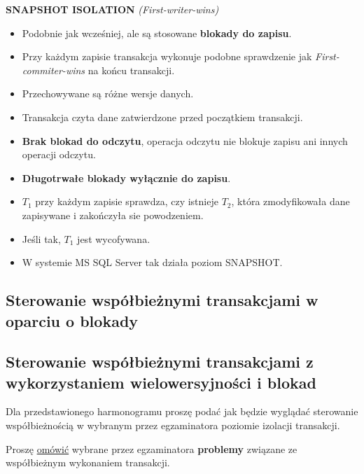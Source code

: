 \textbf{SNAPSHOT ISOLATION} \textit{(First-writer-wins)}
\begin{itemize}
    \item Podobnie jak wcześniej, ale są stosowane
    \textbf{blokady do zapisu}.
    \item Przy każdym zapisie transakcja wykonuje podobne sprawdzenie jak
    \textit{First-commiter-wins} na końcu transakcji.
    \item Przechowywane są różne wersje danych.
    \item Transakcja czyta dane zatwierdzone przed początkiem transakcji.
    \item \textbf{Brak blokad do odczytu}, operacja odczytu nie blokuje
    zapisu ani innych operacji odczytu.
    \item \textbf{Długotrwałe blokady wyłącznie do zapisu}.
    \item $T_1$ przy każdym zapisie sprawdza, czy istnieje $T_2$, która
    zmodyfikowała dane zapisywane i zakończyła sie powodzeniem.
    \item Jeśli tak, $T_1$ jest wycofywana.
    \item W systemie MS SQL Server tak działa poziom SNAPSHOT.
\end{itemize}

\pagebreak

\subsection{Sterowanie współbieżnymi transakcjami w oparciu o blokady}
\label{sub:sterowanie_wspolbieznymi_blokady}


\subsection{Sterowanie współbieżnymi transakcjami z wykorzystaniem
wielowersyjności i blokad} %
\label{sub:sterowanie_wspolbieznymi_wielowier}

\horrule{0.5pt}
Dla przedstawionego harmonogramu proszę podać jak będzie wyglądać sterowanie
współbieżnością w wybranym przez egzaminatora poziomie izolacji
transakcji.\\
\horrule{0.5pt}

\pagebreak

\horrule{0.5pt}
Proszę \underline{omówić} wybrane przez egzaminatora \textbf{problemy}
związane ze współbieżnym wykonaniem transakcji.\\
\horrule{0.5pt}

